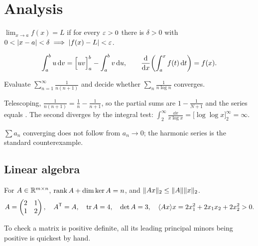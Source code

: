 \documentclass[10pt]{article}
\begin{document}
\section{Analysis}

\begin{definition}[Limit]
  $\lim_{x \to a} f(x) = L$ if for every $\varepsilon > 0$ there is $\delta > 0$ with
  $0 < \lvert x - a\rvert < \delta \implies \lvert f(x) - L\rvert < \varepsilon$.
\end{definition}

\begin{proposition}
  \[ \int_a^b u \dd v = \Big[uv\Big]_a^b - \int_a^b v \dd u,
     \qquad \deriv{}{x}\paren*{\int_a^x f(t) \dd t} = f(x). \]
\end{proposition}

\begin{problem}[Series]\label{prob:series}
  Evaluate $\displaystyle\sum_{n=1}^{\infty} \frac{1}{n(n+1)}$ and decide whether
  $\sum_n \frac{1}{n \log n}$ converges.
\end{problem}
\begin{solution}
  Telescoping, $\frac{1}{n(n+1)} = \frac1n - \frac1{n+1}$, so the partial sums are $1 - \frac1{N+1}$
  and the series equals . The second diverges by the integral test:
  $\int_2^\infty \frac{\dd x}{x \log x} = \big[\log\log x\big]_2^\infty = \infty$.
\end{solution}

\begin{warning}
  $\sum a_n$ converging does not follow from $a_n \to 0$; the harmonic series is the standard counterexample.
\end{warning}

\subsection{Linear algebra}
For $A \in \mathbb{R}^{m \times n}$, $\operatorname{rank} A + \dim\ker A = n$, and $\lVert Ax\rVert_2 \le \lVert A\rVert\lVert x\rVert_2$.
\[
  A = \begin{pmatrix} 2 & 1 \\ 1 & 2 \end{pmatrix}, \quad
  A^{\mathsf{T}} = A, \quad \operatorname{tr} A = 4, \quad \det A = 3, \quad
  \langle Ax\rangle{x} = 2x_1^2 + 2x_1x_2 + 2x_2^2 > 0 .
\]

\begin{tip}
  To check a matrix is positive definite, all its leading principal minors being positive is quickest by hand.
\end{tip}
\end{document}
